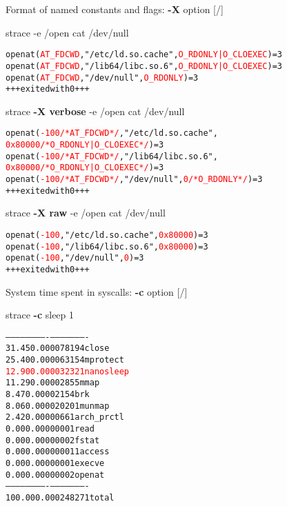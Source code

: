 \documentclass[unicode,aspectratio=169]{beamer}
\begin{document}
\begin{frame}[fragile]{Format of named constants and flags: \textbf{-X} option \hfill [\insertframenumber/\inserttotalframenumber]}
\begin{block}{\large strace -e /open cat /dev/null}
\scriptsize
\begin{alltt}
openat(\textcolor{red}{AT_FDCWD}, "/etc/ld.so.cache", \textcolor{red}{O_RDONLY|O_CLOEXEC}) = 3
openat(\textcolor{red}{AT_FDCWD}, "/lib64/libc.so.6", \textcolor{red}{O_RDONLY|O_CLOEXEC}) = 3
openat(\textcolor{red}{AT_FDCWD}, "/dev/null", \textcolor{red}{O_RDONLY}) = 3
+++ exited with 0 +++
\end{alltt}
\end{block}

\begin{block}{\large strace \textbf{-X verbose} -e /open cat /dev/null}
\scriptsize
\begin{alltt}
openat(\textcolor{red}{-100 /* AT_FDCWD */}, "/etc/ld.so.cache",
       \textcolor{red}{0x80000 /* O_RDONLY|O_CLOEXEC */}) = 3
openat(\textcolor{red}{-100 /* AT_FDCWD */}, "/lib64/libc.so.6",
       \textcolor{red}{0x80000 /* O_RDONLY|O_CLOEXEC */}) = 3
openat(\textcolor{red}{-100 /* AT_FDCWD */}, "/dev/null", \textcolor{red}{0 /* O_RDONLY */}) = 3
+++ exited with 0 +++
\end{alltt}
\end{block}

\begin{block}{\large strace \textbf{-X raw} -e /open cat /dev/null}
\scriptsize
\begin{alltt}
openat(\textcolor{red}{-100}, "/etc/ld.so.cache", \textcolor{red}{0x80000}) = 3
openat(\textcolor{red}{-100}, "/lib64/libc.so.6", \textcolor{red}{0x80000}) = 3
openat(\textcolor{red}{-100}, "/dev/null", \textcolor{red}{0})            = 3
+++ exited with 0 +++
\end{alltt}
\end{block}
\end{frame}

\begin{frame}[fragile]{System time spent in syscalls: \textbf{-c} option \hfill [\insertframenumber/\inserttotalframenumber]}
\begin{block}{\large strace \textbf{-c} sleep 1}
\small
\begin{alltt}
% time  seconds usecs/call calls errors syscall
------ -------- ---------- ----- ------ ----------
 31.45 0.000078         19     4        close
 25.40 0.000063         15     4        mprotect
\textcolor{red}{ 12.90 0.000032         32     1        nanosleep}
 11.29 0.000028          5     5        mmap
  8.47 0.000021          5     4        brk
  8.06 0.000020         20     1        munmap
  2.42 0.000006          6     1        arch_prctl
  0.00 0.000000          0     1        read
  0.00 0.000000          0     2        fstat
  0.00 0.000000          0     1      1 access
  0.00 0.000000          0     1        execve
  0.00 0.000000          0     2        openat
------ -------- ---------- ----- ------ ----------
100.00 0.000248               27      1 total
\end{alltt}
\end{block}
\end{frame}
\end{document}
